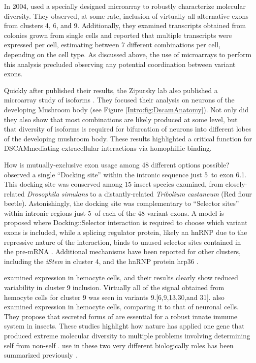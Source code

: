     In 2004, \citet{Neves2004} used a specially designed microarray to robustly characterize \dscam{} molecular diversity. They observed, at some rate, inclusion of virtually all alternative exons from clusters 4, 6, and 9. Additionally, they examined \dscam{} transcripts obtained from colonies grown from single cells and reported that multiple \dscam{} transcripts were expressed per cell, estimating between 7 different combinations per cell, depending on the cell type. As discussed above, the use of microarrays to perform this analysis precluded observing any potential coordination between variant exons.

    Quickly after \citet{Neves2004} published their results, the Zipursky lab also published a microarray study of \dscam{} isoforms \citep{Zhan2004}. They focused their analysis on neurons of the developing Mushroom body (see Figure \ref{Intro:fig:DscamAnatomy}). Not only did they also show that most \dscam{} combinations are likely produced at some level, but that diversity of isoforms is required for bifurcation of neurons into different lobes of the developing mushroom body. These results highlighted a critical function for DSCAM\textendash mediating extracellular interactions via homophillic binding.

    How is mutually-exclusive exon usage among 48 different options possible? \citet{Graveley2005b} observed a single ``Docking site'' within the intronic sequence just 5\textprime~to exon 6.1. This docking site was conserved among 15 insect species examined, from closely-related \textit{Drosophila simulans} to a distantly-related \textit{Tribolium castaneum} (Red flour beetle). Astonishingly, the docking site was complementary to ``Selector sites'' within intronic regions just 5\textprime~of each of the 48 variant exons. A model is proposed where Docking::Selector interaction is required to choose which variant exons is included, while a splicing regulator protein, likely an hnRNP due to the repressive nature of the interaction, binds to unused selector sites contained in the pre-mRNA \citep{Graveley2000}. Additional mechanisms have been reported for other clusters, including the \textit{iStem} \citep{Kreahling2005} in cluster 4, and the hnRNP protein hrp36 \citep{Olson2007}.

    \citep{Neves2004} examined \dscam{} expression in hemocyte cells, and their results clearly show reduced variability in cluster 9 inclusion. Virtually all of the signal obtained from hemocyte cells for cluster 9 was seen in variants 9.[6,9,13,30,and 31]. \citep{Watson2005} also examined \dscam{} expression in hemocyte cells, comparing it to that of neuronal cells. They propose that secreted forms of \dscam{} are essential for a robust innate immune system in insects. These studies highlight how nature has applied one gene that produced extreme molecular diversity to multiple problems involving determining self from non-self \citep{Shi2012a, Hattori2008}. \dscam{} use in these two very different biologically roles has been summarized previously \citep{Hemani2012}. 

